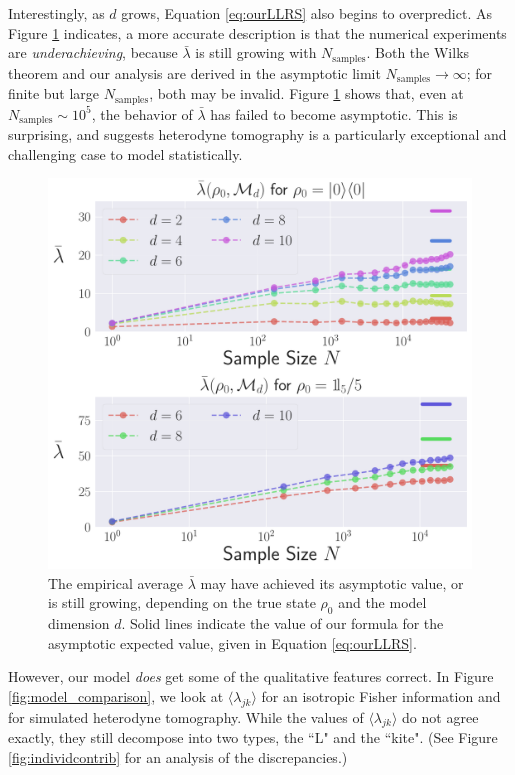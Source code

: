 \documentclass[aps,pra, twocolumn]{revtex4-1}
\begin{document}
Interestingly, as $d$ grows, Equation \eqref{eq:ourLLRS} also begins to overpredict. As Figure \ref{fig:totalcontrib} indicates, a more accurate description is that the numerical experiments are \emph{underachieving}, because $\bar\lambda$ is still growing with $N_{\mathrm{samples}}$.  Both the Wilks theorem and our analysis are derived in the asymptotic limit $N_{\mathrm{samples}} \rightarrow \infty$; for finite but large $N_{\mathrm{samples}}$, both may be invalid.  Figure \ref{fig:totalcontrib} shows that, even at $N_{\mathrm{samples}}\sim 10^{5}$, the behavior of $\bar{\lambda}$ has failed to become asymptotic. This is surprising, and suggests heterodyne tomography is a particularly exceptional and challenging case to model statistically. 

\begin{figure}[t]
  \includegraphics[width=.9\columnwidth]{Images/Figure_12.pdf}
 \caption{The empirical average $\bar{\lambda}$  may have achieved its asymptotic value, or is still 
growing, depending on the true state $\rho_{0}$ and the model dimension $d$. Solid lines indicate the value of our formula
for the asymptotic expected value, given in Equation \eqref{eq:ourLLRS}.}
\label{fig:totalcontrib}
\end{figure}


However, our model \emph{does} get some of the qualitative features correct. In Figure \ref{fig:model_comparison}, we look at $\langle \lambda_{jk}\rangle$ for an isotropic Fisher information and for simulated heterodyne tomography. While the values of $\langle \lambda_{jk} \rangle$ do not agree exactly, they still decompose into two types, the ``L" and the ``kite". (See Figure \ref{fig:individcontrib} for an analysis of the discrepancies.)
 
\end{document}
